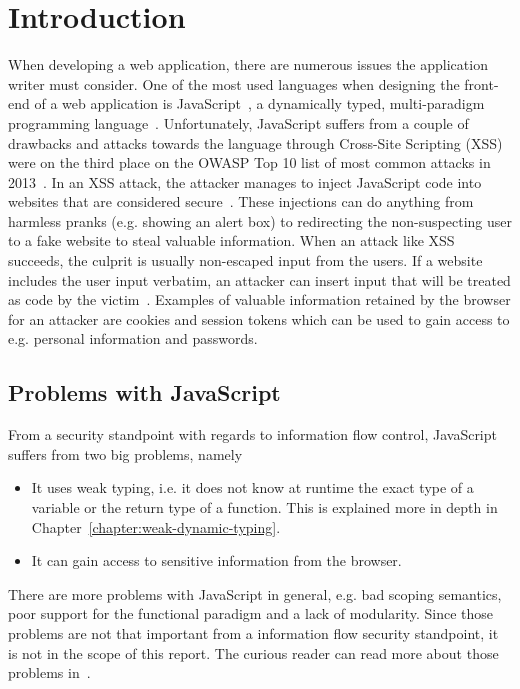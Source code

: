 \chapter{Introduction}
\label{chapter:intro}
When developing a web application, there are numerous issues the application writer must consider. One of the most used languages when designing the front-end of a web application is JavaScript~\cite{javascript_popularity}, a dynamically typed, multi-paradigm programming language~\cite{javascript_info}. Unfortunately, JavaScript suffers from a couple of drawbacks and attacks towards the language through Cross-Site Scripting (XSS) were on the third place on the OWASP Top 10 list of most common attacks in 2013~\cite{owasp_xss_rank}. In an XSS attack, the attacker manages to inject JavaScript code into websites that are considered secure~\cite{owasp_xss, excess_xss}. These injections can do anything from harmless pranks (e.g. showing an alert box) to redirecting the non-suspecting user to a fake website to steal valuable information. When an attack like XSS succeeds, the culprit is usually non-escaped input from the users. If a website includes the user input verbatim, an attacker can insert input that will be treated as code by the victim~\cite{excess_xss}. Examples of valuable information retained by the browser for an attacker are cookies and session tokens which can be used to gain access to e.g. personal information and passwords.
\section{Problems with JavaScript}
From a security standpoint with regards to information flow control, JavaScript suffers from two big problems, namely
\begin{itemize}
  \item It uses weak typing, i.e. it does not know at runtime the exact type of a variable or the return type of a function. This is explained more in depth in Chapter~\ref{chapter:weak-dynamic-typing}.
  \item It can gain access to sensitive information from the browser.
\end{itemize}
There are more problems with JavaScript in general, e.g. bad scoping semantics, poor support for the functional paradigm and a lack of modularity. Since those problems are not that important from a information flow security standpoint, it is not in the scope of this report. The curious reader can read more about those problems in~\cite{haste-lang}.

